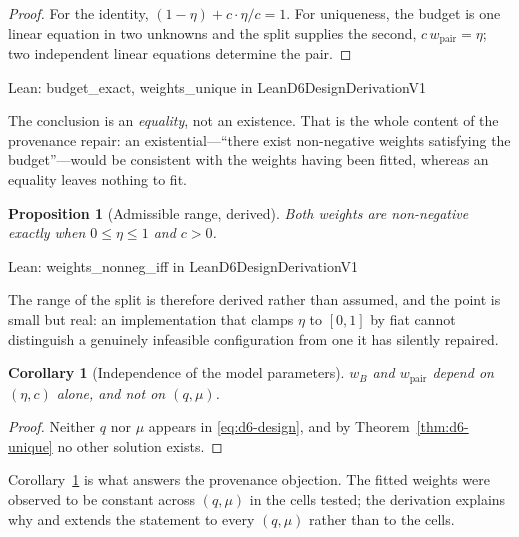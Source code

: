 \documentclass[conference]{IEEEtran}
\newtheorem{proposition}[theorem]{Proposition}
\newtheorem{corollary}[theorem]{Corollary}
\theoremstyle{definition}
\newcommand{\lean}[1]{\textsf{\footnotesize #1}}
\newcommand{\leanbox}[1]{%
  \par\vspace{2pt}\noindent
  {\footnotesize\textsf{Lean: #1}}\par\vspace{2pt}}
\begin{document}
\begin{proof}
For the identity, $(1-\eta)+c\cdot\eta/c=1$. For uniqueness, the budget is one linear
equation in two unknowns and the split supplies the second, $c\,w_{\mathrm{pair}}=\eta$; two
independent linear equations determine the pair.
\end{proof}

\leanbox{\lean{budget\_exact}, \lean{weights\_unique} in
\lean{LeanD6DesignDerivationV1}}

The conclusion is an \emph{equality}, not an existence. That is the whole content of the
provenance repair: an existential---``there exist non-negative weights satisfying the
budget''---would be consistent with the weights having been fitted, whereas an equality leaves
nothing to fit.

\begin{proposition}[Admissible range, derived]
\label{prop:d6-nonneg}
Both weights are non-negative exactly when $0\le\eta\le1$ and $c>0$.
\end{proposition}

\leanbox{\lean{weights\_nonneg\_iff} in \lean{LeanD6DesignDerivationV1}}

The range of the split is therefore derived rather than assumed, and the point is small but
real: an implementation that clamps $\eta$ to $[0,1]$ by fiat cannot distinguish a genuinely
infeasible configuration from one it has silently repaired.

\begin{corollary}[Independence of the model parameters]
\label{cor:d6-indep}
$w_{B}$ and $w_{\mathrm{pair}}$ depend on $(\eta,c)$ alone, and not on $(q,\mu)$.
\end{corollary}

\begin{proof}
Neither $q$ nor $\mu$ appears in \eqref{eq:d6-design}, and by Theorem~\ref{thm:d6-unique} no other
solution exists.
\end{proof}

Corollary~\ref{cor:d6-indep} is what answers the provenance objection. The fitted weights were
observed to be constant across $(q,\mu)$ in the cells tested; the derivation explains why and
extends the statement to every $(q,\mu)$ rather than to the cells.
\end{document}
